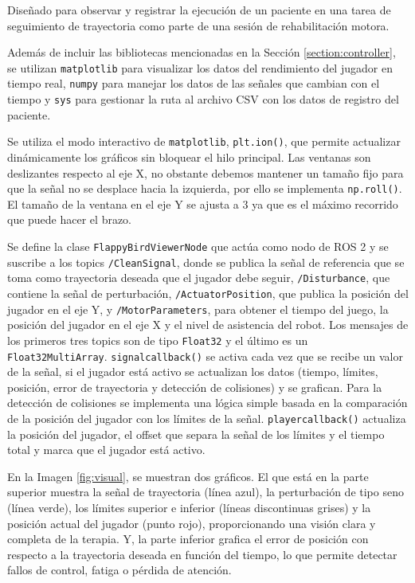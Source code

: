 Diseñado para observar y registrar la ejecución de un paciente en una tarea de seguimiento de trayectoria como parte de una sesión de rehabilitación motora.

Además de incluir las bibliotecas mencionadas en la Sección \ref{section:controller}, se utilizan \verb|matplotlib| para visualizar los datos del rendimiento del jugador en tiempo real, \verb|numpy| para manejar los datos de las señales que cambian con el tiempo y \verb|sys| para gestionar la ruta al archivo CSV con los datos de registro del paciente.

Se utiliza el modo interactivo de \verb|matplotlib|, \verb|plt.ion()|, que permite actualizar dinámicamente los gráficos sin bloquear el hilo principal.
Las ventanas son deslizantes respecto al eje X, no obstante debemos mantener un tamaño fijo para que la señal no se desplace hacia la izquierda, por ello se implementa \verb|np.roll()|.
El tamaño de la ventana en el eje Y se ajusta a $3$ ya que es el máximo recorrido que puede hacer el brazo.

Se define la clase \verb|FlappyBirdViewerNode| que actúa como nodo de ROS 2 y se suscribe a los topics \verb|/CleanSignal|, donde se publica la señal de referencia que se toma como trayectoria deseada que el jugador debe seguir, \verb|/Disturbance|, que contiene la señal de perturbación, \verb|/ActuatorPosition|, que publica la posición del jugador en el eje Y, y \verb|/MotorParameters|, para obtener el tiempo del juego, la posición del jugador en el eje X y el nivel de asistencia del robot.
Los mensajes de los primeros tres topics son de tipo \verb|Float32| y el último es un \verb|Float32MultiArray|.
\verb|signalcallback()| se activa cada vez que se recibe un valor de la señal, si el jugador está activo se actualizan los datos (tiempo, límites, posición, error de trayectoria y detección de colisiones) y se grafican.
Para la detección de colisiones se implementa una lógica simple basada en la comparación de la posición del jugador con los límites de la señal.
\verb|playercallback()| actualiza la posición del jugador, el offset que separa la señal de los límites y el tiempo total y marca que el jugador está activo.

En la Imagen \ref{fig:visual}, se muestran dos gráficos.
El que está en la parte superior muestra la señal de trayectoria (línea azul), la perturbación de tipo seno (línea verde), los límites superior e inferior (líneas discontinuas grises) y la posición actual del jugador (punto rojo), proporcionando una visión clara y completa de la terapia.
Y, la parte inferior grafica el error de posición con respecto a la trayectoria deseada en función del tiempo, lo que permite detectar fallos de control, fatiga o pérdida de atención.

